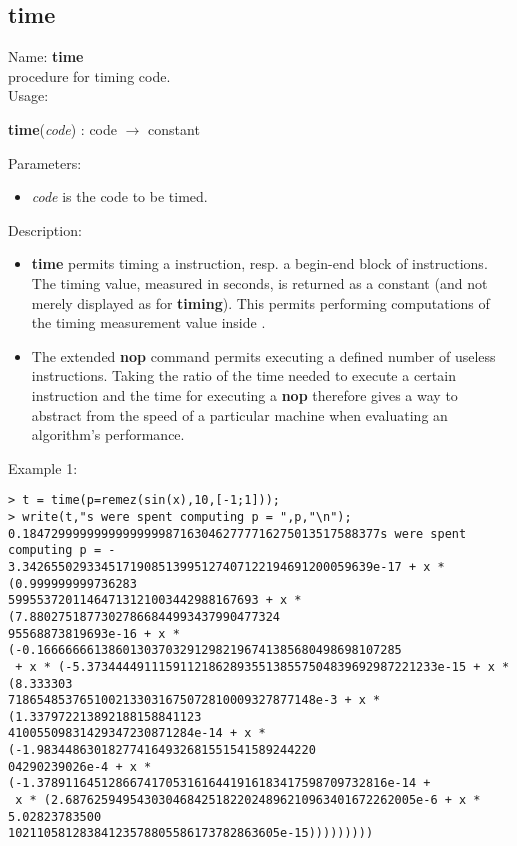 \subsection{time}
\label{labtime}
\noindent Name: \textbf{time}\\
procedure for timing \sollya code.\\
\noindent Usage: 
\begin{center}
\textbf{time}(\emph{code}) : \textsf{code} $\rightarrow$ \textsf{constant}\\
\end{center}
Parameters: 
\begin{itemize}
\item \emph{code} is the code to be timed.
\end{itemize}
\noindent Description: \begin{itemize}

\item \textbf{time} permits timing a \sollya instruction, resp. a begin-end block
   of \sollya instructions. The timing value, measured in seconds, is returned
   as a \sollya constant (and not merely displayed as for \textbf{timing}). This 
   permits performing computations of the timing measurement value inside \sollya.

\item The extended \textbf{nop} command permits executing a defined number of
   useless instructions. Taking the ratio of the time needed to execute a
   certain \sollya instruction and the time for executing a \textbf{nop}
   therefore gives a way to abstract from the speed of a particular 
   machine when evaluating an algorithm's performance.
\end{itemize}
\noindent Example 1: 
\begin{center}\begin{minipage}{15cm}\begin{Verbatim}[frame=single]
> t = time(p=remez(sin(x),10,[-1;1]));
> write(t,"s were spent computing p = ",p,"\n");
0.18472999999999999999871630462777716275013517588377s were spent computing p = -
3.3426550293345171908513995127407122194691200059639e-17 + x * (0.999999999736283
59955372011464713121003442988167693 + x * (7.88027518773027866844993437990477324
95568873819693e-16 + x * (-0.166666661386013037032912982196741385680498698107285
 + x * (-5.3734444911159112186289355138557504839692987221233e-15 + x * (8.333303
7186548537651002133031675072810009327877148e-3 + x * (1.337972213892188158841123
41005509831429347230871284e-14 + x * (-1.983448630182774164932681551541589244220
04290239026e-4 + x * (-1.3789116451286674170531616441916183417598709732816e-14 +
 x * (2.6876259495430304684251822024896210963401672262005e-6 + x * 5.02823783500
10211058128384123578805586173782863605e-15)))))))))
\end{Verbatim}
\end{minipage}\end{center}
